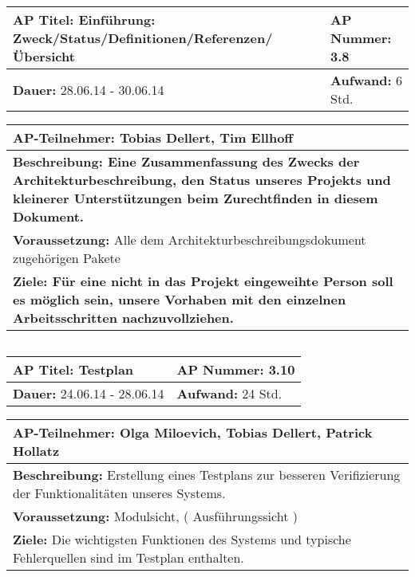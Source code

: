 \begin{tabular}{|p{7.43cm}|p{7.43cm}|}
\hline
\textbf{AP Titel: }Einführung: Zweck/Status/Definitionen/Referenzen/Übersicht & \textbf{AP Nummer: }3.8\\ 
\hline
\textbf{Dauer: }28.06.14 - 30.06.14& \textbf{Aufwand: }6 Std.\\
\hline
\end{tabular}
\begin{tabular}{|p{15.3cm}|}
\hline
\textbf{AP-Teilnehmer: }Tobias Dellert, Tim Ellhoff\\
\hline
\textbf{Beschreibung: Eine Zusammenfassung des Zwecks der Architekturbeschreibung, den Status unseres Projekts und kleinerer Unterstützungen beim Zurechtfinden in diesem Dokument.}\\
\hline
\textbf{Voraussetzung: }Alle dem Architekturbeschreibungsdokument zugehörigen Pakete\\
\hline 
\textbf{Ziele: Für eine nicht in das Projekt eingeweihte Person soll es möglich sein, unsere Vorhaben mit den einzelnen Arbeitsschritten nachzuvollziehen.}\\
\hline 
\end{tabular}
\begin{verbatim}

\end{verbatim}

\begin{tabular}{|p{7.43cm}|p{7.43cm}|}
\hline
\textbf{AP Titel: }Testplan & \textbf{AP Nummer: }3.10\\ 
\hline
\textbf{Dauer: }24.06.14 - 28.06.14& \textbf{Aufwand: }24 Std.\\
\hline
\end{tabular}
\begin{tabular}{|p{15.3cm}|}
\hline
\textbf{AP-Teilnehmer: }Olga Miloevich, Tobias Dellert, Patrick Hollatz\\
\hline
\textbf{Beschreibung: } Erstellung eines Testplans zur besseren Verifizierung der Funktionalitäten unseres Systems. \\
\hline
\textbf{Voraussetzung: }Modulsicht, ( Ausführungssicht )\\
\hline 
\textbf{Ziele: } Die wichtigsten Funktionen des Systems und typische Fehlerquellen sind im Testplan enthalten. \\
\hline 
\end{tabular}
\begin{verbatim}

\end{verbatim}

